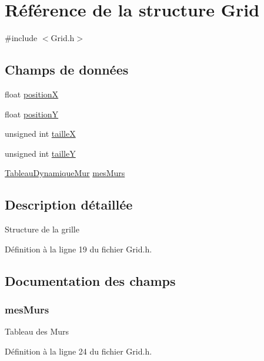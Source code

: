 \hypertarget{struct_grid}{\section{Référence de la structure Grid}
\label{struct_grid}
}


{\ttfamily \#include $<$Grid.\-h$>$}

\subsection*{Champs de données}
\begin{DoxyCompactItemize}
\item 
float \hyperlink{struct_grid_a79a982036e5591bf27af7cc2edcd6f4c}{position\-X}
\item 
float \hyperlink{struct_grid_ad17be35b83017d6dc83074e6b8d21207}{position\-Y}
\item 
unsigned int \hyperlink{struct_grid_a14a7f2008ff990cae95babeb28176bad}{taille\-X}
\item 
unsigned int \hyperlink{struct_grid_ab277c464cec35f230262c48fec89a566}{taille\-Y}
\item 
\hyperlink{struct_tableau_dynamique_mur}{Tableau\-Dynamique\-Mur} \hyperlink{struct_grid_a65b5696754edc0293cfd018ed2f2c2a2}{mes\-Murs}
\end{DoxyCompactItemize}


\subsection{Description détaillée}
Structure de la grille 

Définition à la ligne 19 du fichier Grid.\-h.



\subsection{Documentation des champs}
\hypertarget{struct_grid_a65b5696754edc0293cfd018ed2f2c2a2}{
\subsubsection[{mes\-Murs}]{ mes\-Murs}}\label{struct_grid_a65b5696754edc0293cfd018ed2f2c2a2}
Tableau des Murs 

Définition à la ligne 24 du fichier Grid.\-h.

